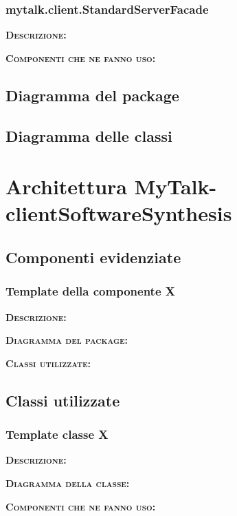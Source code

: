 \subsubsection{mytalk.client.StandardServerFacade}
\begin{description}
	\item{\scshape\bfseries Descrizione:} 
	\item{\scshape\bfseries Componenti che ne fanno uso:} 
\end{description}

\subsection{Diagramma del package}

\subsection{Diagramma delle classi}
\clearpage

\section{Architettura MyTalk-clientSoftwareSynthesis}

\subsection{Componenti evidenziate}

\subsubsection{Template della componente X}
\begin{description}
	\item{\scshape\bfseries Descrizione:} 
	\item{\scshape\bfseries Diagramma del package:}
	\item{\scshape\bfseries Classi utilizzate:} 
\end{description}

\subsection{Classi utilizzate}

\subsubsection{Template classe X}
\begin{description}
	\item{\scshape\bfseries Descrizione:} 
	\item{\scshape\bfseries Diagramma della classe:}
	\item{\scshape\bfseries Componenti che ne fanno uso:} 
\end{description}

